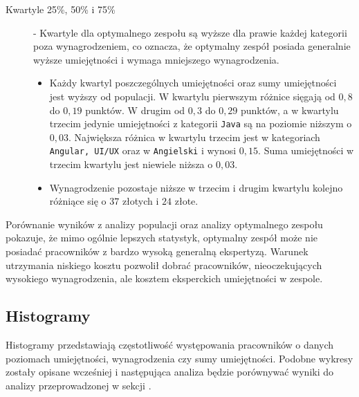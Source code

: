 \begin{description}
        \item[Kwartyle 25\%, 50\% i 75\%\label{itm:kwartyl_2}] - Kwartyle dla optymalnego zespołu są wyższe dla prawie każdej kategorii poza wynagrodzeniem, co oznacza, że optymalny zespół posiada generalnie wyższe umiejętności i wymaga mniejszego wynagrodzenia.
            \begin{itemize}
                \item Każdy kwartyl poszczególnych umiejętności oraz sumy umiejętności jest wyższy od populacji. W kwartylu pierwszym różnice sięgają od $0,8$ do $0,19$ punktów. W drugim od $0,3$ do $0,29$ punktów, a w kwartylu trzecim jedynie umiejętności z kategorii \verb|Java| są na poziomie niższym o $0,03$. Największa różnica w kwartylu trzecim jest w kategoriach \verb|Angular, UI/UX| oraz w \verb|Angielski| i wynosi $0,15$. Suma umiejętności w trzecim kwartylu jest niewiele niższa o $0,03$.
                \item Wynagrodzenie pozostaje niższe w trzecim i drugim kwartylu kolejno różniące się o $37$ złotych i $24$ złote.
            \end{itemize}
        
    \end{description}
    
    \par Porównanie wyników z analizy populacji oraz analizy optymalnego zespołu pokazuje, że mimo ogólnie lepszych statystyk, optymalny zespół może nie posiadać pracowników z bardzo wysoką generalną ekspertyzą. Warunek utrzymania niskiego kosztu pozwolił dobrać pracowników, nieoczekujących wysokiego wynagrodzenia, ale kosztem eksperckich umiejętności w zespole.
    
    \subsection{Histogramy}
    \par Histogramy przedstawiają częstotliwość występowania pracowników o danych poziomach umiejętności, wynagrodzenia czy sumy umiejętności. Podobne wykresy zostały opisane wcześniej i następująca analiza będzie porównywać wyniki do analizy przeprowadzonej w sekcji .
    
